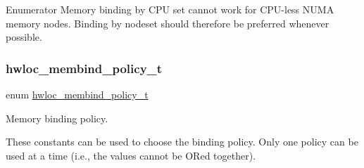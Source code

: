 \begin{DoxyEnumFields}{Enumerator}
Memory binding by C\+PU set cannot work for C\+P\+U-\/less N\+U\+MA memory nodes. Binding by nodeset should therefore be preferred whenever possible. \\
\hline

\end{DoxyEnumFields}
\mbox{\label{a00191_gac9764f79505775d06407b40f5e4661e8}} 
\subsubsection{\texorpdfstring{hwloc\+\_\+membind\+\_\+policy\+\_\+t}{hwloc\_membind\_policy\_t}}
{\footnotesize\ttfamily enum \hyperlink{a00191_gac9764f79505775d06407b40f5e4661e8}{hwloc\+\_\+membind\+\_\+policy\+\_\+t}}



Memory binding policy. 

These constants can be used to choose the binding policy. Only one policy can be used at a time (i.\+e., the values cannot be OR\textquotesingle{}ed together).

